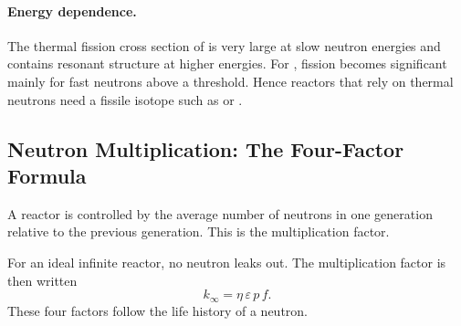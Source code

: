 \paragraph{Energy dependence.}
The thermal fission cross section of  is very large at slow
neutron energies and contains resonant structure at higher energies. For
, fission becomes significant mainly for fast neutrons above a
threshold. Hence reactors that rely on thermal neutrons need a fissile isotope
such as  or .


\subsection{Neutron Multiplication: The Four-Factor Formula}
\label{subsec:lec11:four_factor}

A reactor is controlled by the average number of neutrons in one generation
relative to the previous generation. This is the multiplication factor.


For an ideal infinite reactor, no neutron leaks out. The multiplication factor is
then written
\begin{equation}
  \boxed{k_\infty=\eta\,\varepsilon\,p\,f.}
  \label{eq:lec11:four_factor}
\end{equation}
These four factors follow the life history of a neutron.

